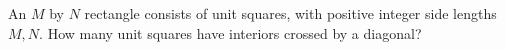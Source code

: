 An $M$ by $N$ rectangle consists of unit squares, with positive integer side lengths $M,N$. How many unit squares have interiors crossed by a diagonal?
